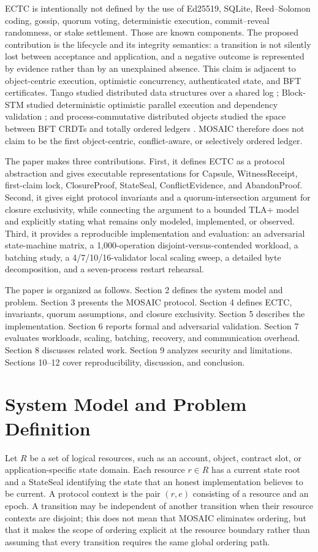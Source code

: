\documentclass{ledger}
\begin{document}
ECTC is intentionally not defined by the use of Ed25519, SQLite, Reed--Solomon coding, gossip, quorum voting, deterministic execution, commit--reveal randomness, or stake settlement. Those are known components. The proposed contribution is the lifecycle and its integrity semantics: a transition is not silently lost between acceptance and application, and a negative outcome is represented by evidence rather than by an unexplained absence. This claim is adjacent to object-centric execution, optimistic concurrency, authenticated state, and BFT certificates. Tango studied distributed data structures over a shared log \cite{Balakrishnan2013Tango}; Block-STM studied deterministic optimistic parallel execution and dependency validation \cite{Gelashvili2022BlockSTM}; and process-commutative distributed objects studied the space between BFT CRDTs and totally ordered ledgers \cite{Frey2024BFTCRDT}. MOSAIC therefore does not claim to be the first object-centric, conflict-aware, or selectively ordered ledger.

The paper makes three contributions. First, it defines ECTC as a protocol abstraction and gives executable representations for Capsule, WitnessReceipt, first-claim lock, ClosureProof, StateSeal, ConflictEvidence, and AbandonProof. Second, it gives eight protocol invariants and a quorum-intersection argument for closure exclusivity, while connecting the argument to a bounded TLA+ model and explicitly stating what remains only modeled, implemented, or observed. Third, it provides a reproducible implementation and evaluation: an adversarial state-machine matrix, a 1,000-operation disjoint-versus-contended workload, a batching study, a 4/7/10/16-validator local scaling sweep, a detailed byte decomposition, and a seven-process restart rehearsal.

The paper is organized as follows. Section 2 defines the system model and problem. Section 3 presents the MOSAIC protocol. Section 4 defines ECTC, invariants, quorum assumptions, and closure exclusivity. Section 5 describes the implementation. Section 6 reports formal and adversarial validation. Section 7 evaluates workloads, scaling, batching, recovery, and communication overhead. Section 8 discusses related work. Section 9 analyzes security and limitations. Sections 10--12 cover reproducibility, discussion, and conclusion.

\section{System Model and Problem Definition}
Let $R$ be a set of logical resources, such as an account, object, contract slot, or application-specific state domain. Each resource $r\in R$ has a current state root and a StateSeal identifying the state that an honest implementation believes to be current. A protocol context is the pair $(r,e)$ consisting of a resource and an epoch. A transition may be independent of another transition when their resource contexts are disjoint; this does not mean that MOSAIC eliminates ordering, but that it makes the scope of ordering explicit at the resource boundary rather than assuming that every transition requires the same global ordering path.
\end{document}

